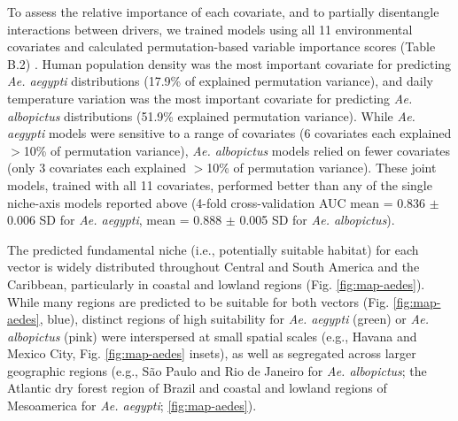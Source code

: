 To assess the relative importance of each covariate, and to partially disentangle interactions between drivers, we trained models using all 11 environmental covariates and calculated permutation-based variable importance scores (Table B.2) \cite{Phillips2008-ic}. Human population density was the most important covariate for predicting \textit{Ae. aegypti} distributions (17.9\% of explained permutation variance), and daily temperature variation was the most important covariate for predicting \textit{Ae. albopictus} distributions (51.9\% explained permutation variance). While \textit{Ae. aegypti} models were sensitive to a range of covariates (6 covariates each explained $>$10\% of permutation variance), \textit{Ae. albopictus} models relied on fewer covariates (only 3 covariates each explained $>$10\% of permutation variance). These joint models, trained with all 11 covariates, performed better than any of the single niche-axis models reported above (4-fold cross-validation AUC mean = 0.836 $\pm$ 0.006 SD for \textit{Ae. aegypti}, mean = 0.888 $\pm$ 0.005 SD for \textit{Ae. albopictus}).

The predicted fundamental niche (i.e., potentially suitable habitat) for each vector is widely distributed throughout Central and South America and the Caribbean, particularly in coastal and lowland regions (Fig. \ref{fig:map-aedes}). While many regions are predicted to be suitable for both vectors (Fig. \ref{fig:map-aedes}, blue), distinct regions of high suitability for \textit{Ae. aegypti} (green) or \textit{Ae. albopictus} (pink) were interspersed at small spatial scales (e.g., Havana and Mexico City, Fig. \ref{fig:map-aedes} insets), as well as segregated across larger geographic regions (e.g., São Paulo and Rio de Janeiro for \textit{Ae. albopictus}; the Atlantic dry forest region of Brazil and coastal and lowland regions of Mesoamerica for \textit{Ae. aegypti}; \ref{fig:map-aedes}).

